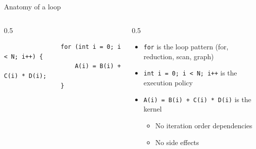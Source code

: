 \documentclass[
    aspectratio=169,
]{beamer}
\begin{document}
\begin{frame}[fragile]{Anatomy of a loop}
    \begin{columns}
        \begin{column}{0.5\linewidth}
            \begin{verbatim}
                for (int i = 0; i < N; i++) {
                    A(i) = B(i) + C(i) * D(i);
                }
            \end{verbatim}
        \end{column}
        \begin{column}{0.5\linewidth}
            \begin{itemize}
                \item \texttt{for} is the loop pattern (for, reduction, scan, graph)
                \item \texttt{int i = 0; i < N; i++} is the execution policy
                \item \texttt{A(i) = B(i) + C(i) * D(i)} is the kernel
                \begin{itemize}
                    \item No iteration order dependencies
                    \item No side effects
                \end{itemize}
            \end{itemize}
        \end{column}
    \end{columns}
\end{frame}
\end{document}
